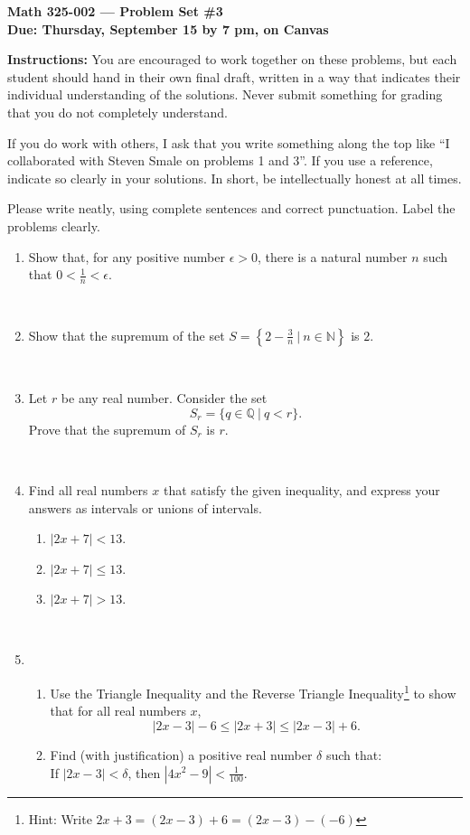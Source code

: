\documentclass{amsart}
\def\e{\varepsilon}
\def\N{\mathbb N}
\def\Q{\mathbb Q}
\def\ds{\displaystyle}
\def\e{\epsilon}
\begin{document}
\begin{center}
{\large\bfseries
Math 325-002 --- Problem Set \#3 \\
Due: Thursday, September 15 by 7 pm, on Canvas}
\end{center}





{\bf Instructions:} You are encouraged to work together on these
problems, but each student should hand in their own final draft,
written in a way that indicates their individual understanding of
the solutions. Never submit something for grading
that you do not completely understand. 

If you do work with others, I ask that you write something along the
top like ``I collaborated with Steven Smale on problems 1 and 3''.
If you use a reference, indicate so clearly in your solutions. 
In short, be intellectually
honest at all times.

Please write neatly, using complete sentences and correct
punctuation. Label the problems clearly. 






\begin{enumerate}
\item Show that, for any positive number $\e>0$, there is a natural number $n$ such that $0 <  \frac1n <\e $.

\

\item Show that the supremum of the set $\ds S= \left\{ 2 - \frac3n \ | \ n\in \N\right\}$ is $2$.

\

\item Let $r$ be any real number. Consider the set
\[ S_r = \{ q\in \Q \ | \ q < r\}.\]
Prove that the supremum of $S_r$ is $r$.

\

\item Find all real numbers $x$ that satisfy the given inequality, and express your answers as intervals or unions of intervals.
\begin{enumerate}
\item $|2x+7| < 13$.
\item $|2x+7| \leq 13$.
\item $|2x+7| > 13$.
\end{enumerate}

\

\item \begin{enumerate}
\item Use the Triangle Inequality and the Reverse Triangle Inequality\footnote{Hint: Write $2x+3 = (2x - 3) + 6 = (2x-3) - (-6)$} to show that for all real numbers $x$,
\[ |2x-3| - 6 \leq |2x+3| \leq |2x-3| + 6.\]
\item Find (with justification) a positive real number $\delta$ such that:\\
If $|2x-3| < \delta$, then $|4x^2-9|< \frac{1}{100}$.
\end{enumerate}



\end{enumerate}
\end{document}
